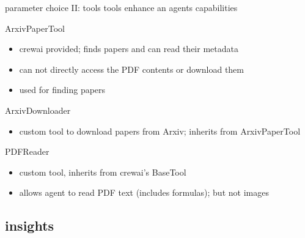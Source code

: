 \documentclass[t]{beamer}
\numberwithin{equation}{section}
\begin{document}
	\begin{frame}[c]{parameter choice II: tools}
		tools enhance an agents capabilities
		\pause
		\begin{block}{ArxivPaperTool}
			\begin{itemize}
				\item crewai provided; finds papers and can read their metadata
				\item can not directly access the PDF contents or download them
				\item used for finding papers
				\end{itemize}
		\end{block}
		\pause
		\begin{block}{ArxivDownloader}
			\begin{itemize}
				\item custom tool to download papers from Arxiv; inherits from ArxivPaperTool
			\end{itemize}
		\end{block}
		\pause
		\begin{alertblock}{PDFReader}
			\begin{itemize}
				\item custom tool, inherits from crewai's BaseTool
				\item allows agent to read PDF text (includes formulas); but not images
			\end{itemize}
		\end{alertblock}
	\end{frame}
	
	\subsection{insights}
	
\end{document}
